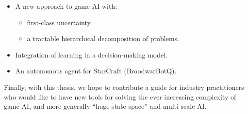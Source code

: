 
\begin{itemize}
\item A new approach to game AI with:
\begin{itemize}
\item first-class uncertainty.
\item a tractable hierarchical decomposition of problems.
\end{itemize}
\item Integration of learning in a decision-making model. 
\item An autonomous agent for StarCraft (BroodwarBotQ).
\end{itemize}

Finally, with this thesis, we hope to contribute a guide for industry practitioners who would like to have new tools for solving the ever increasing complexity of game AI, and more generally ``huge state space'' and multi-scale AI.


